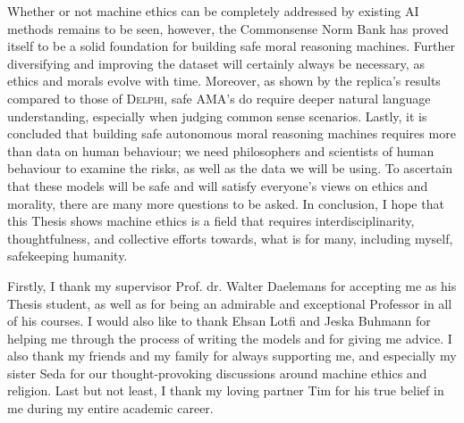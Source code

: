 \documentclass[final]{clv3} %
\begin{document}
Whether or not machine ethics can be completely addressed by existing AI methods remains to be seen, however, the Commonsense Norm Bank has proved itself to be a solid foundation for building safe moral reasoning machines. Further diversifying and improving the dataset will certainly always be necessary, as ethics and morals evolve with time. Moreover, as shown by the replica’s results compared to those of \textsc{Delphi}, safe AMA’s do require deeper natural language understanding, especially when judging common sense scenarios. Lastly, it is concluded that building safe autonomous moral reasoning machines requires more than data on human behaviour; we need philosophers and scientists of human behaviour to examine the risks, as well as the data we will be using. To ascertain that these models will be safe and will satisfy everyone’s views on ethics and morality, there are many more questions to be asked. In conclusion, I hope that this Thesis shows machine ethics is a field that requires interdisciplinarity, thoughtfulness, and collective efforts towards, what is for many, including myself, safekeeping humanity.

\clearpage

\begin{acknowledgments}
Firstly, I thank my supervisor Prof. dr. Walter Daelemans for accepting me as his Thesis student, as well as for being an admirable and exceptional Professor in all of his courses. I would also like to thank Ehsan Lotfi and Jeska Buhmann for helping me through the process of writing the models and for giving me advice. I also thank my friends and my family for always supporting me, and especially my sister Seda for our thought-provoking discussions around machine ethics and religion. Last but not least, I thank my loving partner Tim for his true belief in me during my entire academic career. 
\end{acknowledgments}

\clearpage


\end{document}
